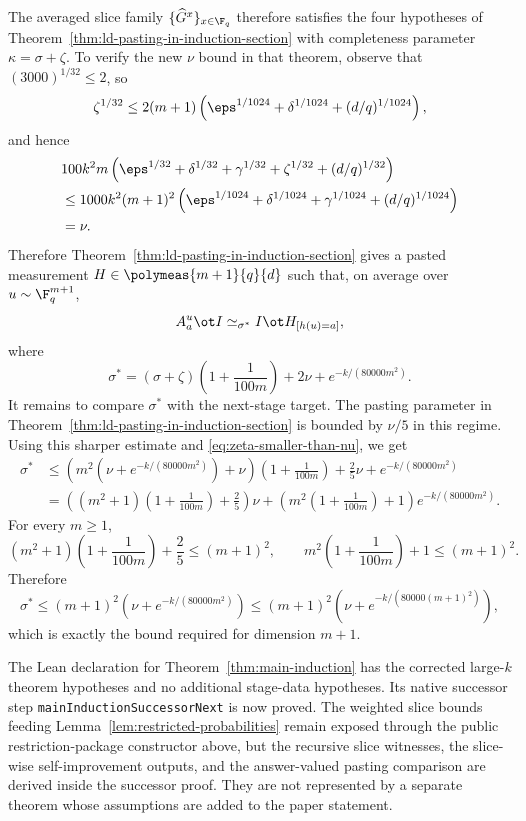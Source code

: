 	The averaged slice family $\{\widehat G^x\}_{x \in \F_q}$ therefore satisfies the four hypotheses of Theorem~\ref{thm:ld-pasting-in-induction-section} with completeness parameter $\kappa=\sigma+\zeta$. To verify the new $\nu$ bound in that theorem, observe that $(3000)^{1/32} \le 2$, so
	\[
		\zeta^{1/32} \le 2(m+1)\left(\eps^{1/1024}+\delta^{1/1024}+(d/q)^{1/1024}\right),
	\]
	and hence
	\begin{align*}
		 & 100k^2m\left(\eps^{1/32}+\delta^{1/32}+\gamma^{1/32}+\zeta^{1/32}+(d/q)^{1/32}\right)       \\
		 & \le 1000k^2(m+1)^2\left(\eps^{1/1024}+\delta^{1/1024}+\gamma^{1/1024}+(d/q)^{1/1024}\right) \\
		 & = \nu.
	\end{align*}
	Therefore Theorem~\ref{thm:ld-pasting-in-induction-section} gives a pasted measurement $H \in \polymeas{m+1}{q}{d}$ such that, on average over $u \sim \F_q^{m+1}$,
	\[
		A_a^u \ot I \simeq_{\sigma^*} I \ot H_{[h(u)=a]},
	\]
	where
	\[
		\sigma^* = (\sigma+\zeta)\left(1+\frac{1}{100m}\right) + 2\nu + e^{-k/(80000m^2)}.
	\]
	It remains to compare $\sigma^*$ with the next-stage target. The pasting
	parameter in Theorem~\ref{thm:ld-pasting-in-induction-section} is bounded by
	$\nu/5$ in this regime. Using this sharper estimate and
	\eqref{eq:zeta-smaller-than-nu}, we get
	\begin{align*}
		\sigma^*
		 & \le \left(m^2\left(\nu+e^{-k/(80000m^2)}\right)+\nu\right)
		      \left(1+\frac{1}{100m}\right) + \frac{2}{5}\nu
		      + e^{-k/(80000m^2)} \\
		 & = \left((m^2+1)\left(1+\frac{1}{100m}\right)+\frac{2}{5}\right)\nu
		     + \left(m^2\left(1+\frac{1}{100m}\right)+1\right)e^{-k/(80000m^2)}.
	\end{align*}
	For every $m\ge 1$,
	\[
		(m^2+1)\left(1+\frac{1}{100m}\right)+\frac{2}{5}\le (m+1)^2,
		\qquad
		m^2\left(1+\frac{1}{100m}\right)+1\le (m+1)^2.
	\]
	Therefore
	\[
		\sigma^* \le (m+1)^2\left(\nu+e^{-k/(80000m^2)}\right)
		\le (m+1)^2\left(\nu+e^{-k/(80000(m+1)^2)}\right),
	\]
	which is exactly the bound required for dimension $m+1$.

\begin{remark}\label{rem:main-induction-successor-assembly}
	The Lean declaration for
	Theorem~\ref{thm:main-induction} has the corrected
	large-\(k\) theorem hypotheses and no additional stage-data hypotheses.  Its
	native successor step \texttt{mainInductionSuccessorNext} is now proved.  The
	weighted slice bounds feeding Lemma~\ref{lem:restricted-probabilities} remain
	exposed through the public restriction-package constructor above, but the
	recursive slice witnesses, the slice-wise self-improvement outputs, and the
	answer-valued pasting comparison are derived inside the successor proof.  They
	are not represented by a separate theorem whose assumptions are added to the
	paper statement.
\end{remark}

